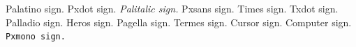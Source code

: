 \documentclass{article}
\begin{document}
Palatino \textsurd{} sign.
Pxdot \textperiodcentered{} sign.
\textit{Palitalic \textsurd{} sign.}
\textsf{Pxsans \textsurd{} sign.}
{\selectfont Times \textsurd{} sign.}
{\selectfont Txdot \textperiodcentered{} sign.}
{\selectfont Palladio \textsurd{} sign.}
{\selectfont Heros \textsurd{} sign.}
{\selectfont Pagella \textsurd{} sign.}
{\selectfont Termes \textsurd{} sign.}
{\selectfont Cursor \textsurd{} sign.}
{\selectfont Computer \textsurd{} sign.}
\texttt{Pxmono \textsurd{} sign.}
\end{document}
